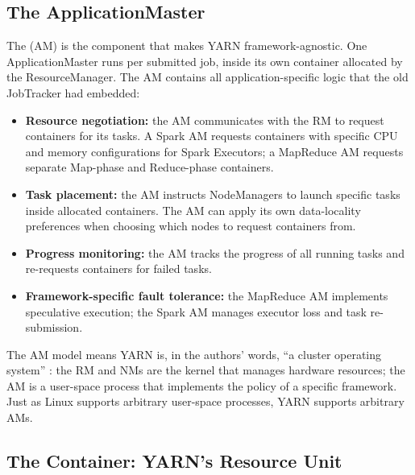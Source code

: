 \subsection{The ApplicationMaster}
\label{subsec:am}

The  (AM) is the component that makes YARN
framework-agnostic. One ApplicationMaster runs per submitted job, inside
its own container allocated by the ResourceManager. The AM contains all
application-specific logic that the old JobTracker had embedded:

\begin{itemize}
  \item \textbf{Resource negotiation:} the AM communicates with the RM to
        request containers for its tasks. A Spark AM requests containers
        with specific CPU and memory configurations for Spark Executors;
        a MapReduce AM requests separate Map-phase and Reduce-phase
        containers.
  \item \textbf{Task placement:} the AM instructs NodeManagers to launch
        specific tasks inside allocated containers. The AM can apply its
        own data-locality preferences when choosing which nodes to request
        containers from.
  \item \textbf{Progress monitoring:} the AM tracks the progress of all
        running tasks and re-requests containers for failed tasks.
  \item \textbf{Framework-specific fault tolerance:} the MapReduce AM
        implements speculative execution; the Spark AM manages executor
        loss and task re-submission.
\end{itemize}

The AM model means YARN is, in the authors' words, ``a cluster operating
system'' \parencite{YARN2013}: the RM and NMs are the kernel that
manages hardware resources; the AM is a user-space process that
implements the policy of a specific framework. Just as Linux supports
arbitrary user-space processes, YARN supports arbitrary AMs.

\subsection{The Container: YARN's Resource Unit}
\label{subsec:container}


